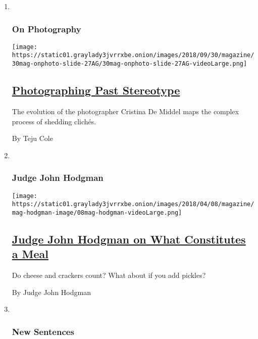 \begin{enumerate}
\def\labelenumi{\arabic{enumi}.}
\item ~
  \hypertarget{on-photography}{%
  \subsubsection{On Photography}\label{on-photography}}

  \texttt{[image: https://static01.graylady3jvrrxbe.onion/images/2018/09/30/magazine/30mag-onphoto-slide-27AG/30mag-onphoto-slide-27AG-videoLarge.png]}

  \hypertarget{photographing-past-stereotype}{%
  \subsection{\texorpdfstring{\href{/2018/09/27/magazine/photographing-past-stereotype.html}{Photographing
  Past
  Stereotype}}{Photographing Past Stereotype}}\label{photographing-past-stereotype}}

  The evolution of the photographer Cristina De Middel maps the complex
  process of shedding clichés.

  By Teju Cole
\item ~
  \hypertarget{judge-john-hodgman}{%
  \subsubsection{Judge John Hodgman}\label{judge-john-hodgman}}

  \texttt{[image: https://static01.graylady3jvrrxbe.onion/images/2018/04/08/magazine/mag-hodgman-image/08mag-hodgman-videoLarge.png]}

  \hypertarget{judge-john-hodgman-on-what-constitutes-a-meal}{%
  \subsection{\texorpdfstring{\href{/2018/09/27/magazine/judge-john-hodgman-on-what-constitutes-a-meal.html}{Judge
  John Hodgman on What Constitutes a
  Meal}}{Judge John Hodgman on What Constitutes a Meal}}\label{judge-john-hodgman-on-what-constitutes-a-meal}}

  Do cheese and crackers count? What about if you add pickles?

  By Judge John Hodgman
\item ~
  \hypertarget{new-sentences}{%
  \subsubsection{New Sentences}\label{new-sentences}}


\end{enumerate}
